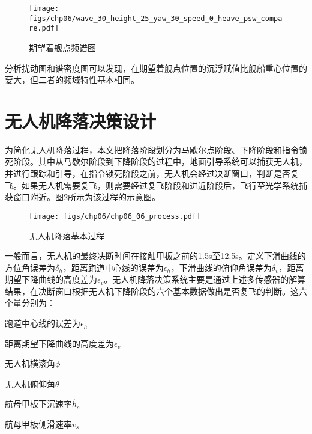  \begin{figure}[!ht]
	\centering
	\texttt{[image: figs/chp06/wave\_30\_height\_25\_yaw\_30\_speed\_0\_heave\_psw\_compare.pdf]}	
	\caption{期望着舰点频谱图}
	\label{fig:wave_30_height_25_yaw_30_speed_0_heave_psw_compare}
\end{figure}
分析扰动图和谱密度图可以发现，在期望着舰点位置的沉浮赋值比舰船重心位置的要大，但二者的频域特性基本相同。

\section{无人机降落决策设计}
为简化无人机降落过程，本文把降落阶段划分为马歇尔点阶段、下降阶段和指令锁死阶段。其中从马歇尔阶段到下降阶段的过程中，地面引导系统可以捕获无人机，并进行跟踪和引导，在指令锁死阶段之前，无人机会经过决断窗口，判断是否复飞。如果无人机需要复飞，则需要经过复飞阶段和进近阶段后，飞行至光学系统捕获窗口附近。图\ref{fig:chp06_06_process}所示为该过程的示意图。
\begin{figure}[!tb]
	\centering
	\texttt{[image: figs/chp06/chp06\_06\_process.pdf]}	
	\caption{无人机降落基本过程}
	\label{fig:chp06_06_process}
\end{figure}

一般而言，无人机的最终决断时间在接触甲板之前的1.5s至12.5s。定义下滑曲线的方位角误差为$\delta_h$，距离跑道中心线的误差为$\epsilon_h$，下滑曲线的俯仰角误差为$\delta_v$，距离期望下降曲线的高度差为$\epsilon_v$。无人机降落决策系统主要是通过上述多传感器的解算结果，在决断窗口根据无人机下降阶段的六个基本数据做出是否复飞的判断。这六个量分别为：
\begin{compactenum}
\item 跑道中心线的误差为$\epsilon_h$
\item 距离期望下降曲线的高度差为$\epsilon_v$
\item 无人机横滚角$\phi$
\item 无人机俯仰角$\theta$
\item 航母甲板下沉速率$\dot{h_c}$
\item 航母甲板侧滑速率$v_s$
\end{compactenum}


